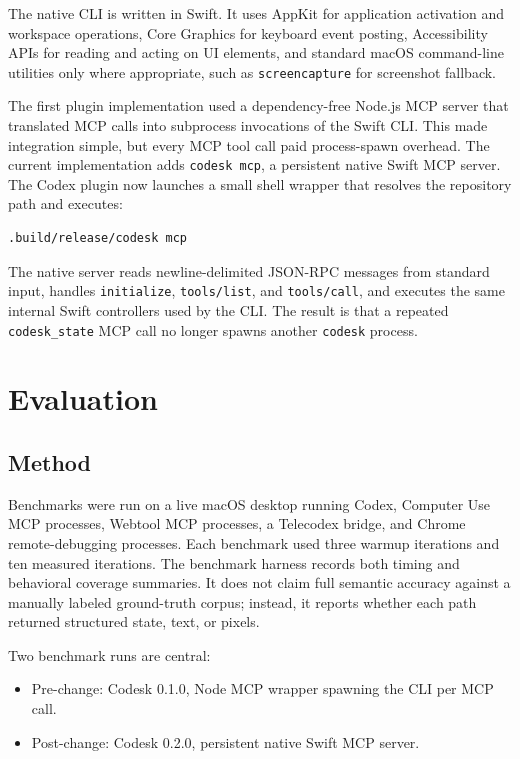 \documentclass[11pt]{article}
\begin{document}
The native CLI is written in Swift. It uses AppKit for application activation and workspace operations, Core Graphics for keyboard event posting, Accessibility APIs for reading and acting on UI elements, and standard macOS command-line utilities only where appropriate, such as \texttt{screencapture} for screenshot fallback.

The first plugin implementation used a dependency-free Node.js MCP server that translated MCP calls into subprocess invocations of the Swift CLI. This made integration simple, but every MCP tool call paid process-spawn overhead. The current implementation adds \texttt{codesk mcp}, a persistent native Swift MCP server. The Codex plugin now launches a small shell wrapper that resolves the repository path and executes:

\begin{verbatim}
.build/release/codesk mcp
\end{verbatim}

The native server reads newline-delimited JSON-RPC messages from standard input, handles \texttt{initialize}, \texttt{tools/list}, and \texttt{tools/call}, and executes the same internal Swift controllers used by the CLI. The result is that a repeated \texttt{codesk\_state} MCP call no longer spawns another \texttt{codesk} process.

\section{Evaluation}

\subsection{Method}

Benchmarks were run on a live macOS desktop running Codex, Computer Use MCP processes, Webtool MCP processes, a Telecodex bridge, and Chrome remote-debugging processes. Each benchmark used three warmup iterations and ten measured iterations. The benchmark harness records both timing and behavioral coverage summaries. It does not claim full semantic accuracy against a manually labeled ground-truth corpus; instead, it reports whether each path returned structured state, text, or pixels.

Two benchmark runs are central:

\begin{itemize}
  \item Pre-change: Codesk 0.1.0, Node MCP wrapper spawning the CLI per MCP call.
  \item Post-change: Codesk 0.2.0, persistent native Swift MCP server.
\end{itemize}
\end{document}
